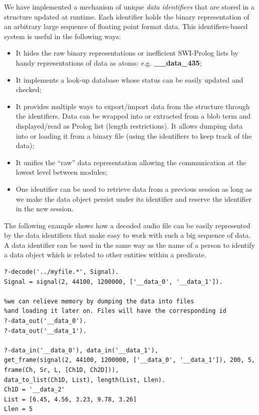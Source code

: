\documentclass[runningheads]{llncs}
\begin{document}
We have implemented a mechanism of unique \textit{data identifiers} that are stored in a structure updated at runtime. Each identifier holds the binary representation of an arbitrary large sequence of floating point format data. This identifiers-based system is useful in the following ways:

\begin{itemize}
 \item It hides the raw binary representations or inefficient SWI-Prolog lists by handy representations of data as atoms: e.g. \textbf{\_\_data\_435};
 \item It implements a look-up database whose status can be easily updated and checked;
 \item It provides multiple ways to export/import data from the structure through the identifiers. Data can be wrapped into or extracted from a blob term and displayed/read as Prolog list (length restrictions). It allows dumping data into or loading it from a binary file (using the identifiers to keep track of the data);
 \item It unifies the ``raw'' data representation allowing the communication at the lowest level between modules;
 \item One identifier can be used to retrieve data from a previous session as long as we make the data object persist under its identifier and reserve the identifier in the new session.
\end{itemize}

The following example shows how a decoded audio file can be easily represented by the data identifiers that make easy to work with such a big sequence of data. A data identifier can be used in the same way as the name of a person to identify a data object which is related to other entities within a predicate.
\begin{verbatim}
?-decode('../myfile.*', Signal).
Signal = signal(2, 44100, 1200000, ['__data_0', '__data_1']).

%we can relieve memory by dumping the data into files 
%and loading it later on. Files will have the corresponding id
?-data_out('__data_0').
?-data_out('__data_1').

?-data_in('__data_0'), data_in('__data_1'),
get_frame(signal(2, 44100, 1200000, ['__data_0', '__data_1']), 200, 5,
frame(Ch, Sr, L, [Ch1D, Ch2D])),
data_to_list(Ch1D, List), length(List, Llen).
Ch1D = '__data_2'
List = [6.45, 4.56, 3.23, 9.78, 3.26]
Llen = 5
\end{verbatim}
\end{document}
